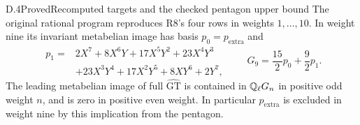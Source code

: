 \begin{statement}{D.4}{Proved}{Recomputed targets and the checked pentagon upper bound}
The original rational program reproduces R8's four rows in weights
$1,\ldots,10$. In weight nine its invariant metabelian image has basis
$p_0=p_{\mathrm{extra}}$ and
\[
\begin{split}
 p_1={}&2X^7+8X^6Y+17X^5Y^2+23X^4Y^3\\
       &+23X^3Y^4+17X^2Y^5+8XY^6+2Y^7,
\end{split}
\qquad G_9=\frac{15}{2}p_0+\frac92p_1.
\]
The leading metabelian image of full $\widehat{\mathrm{GT}}$ is contained
in $\mathbb Q_\ell G_n$ in positive odd weight $n$, and is zero in positive
even weight. In particular $p_{\mathrm{extra}}$ is excluded in weight
nine by this implication from the pentagon.
\end{statement}

